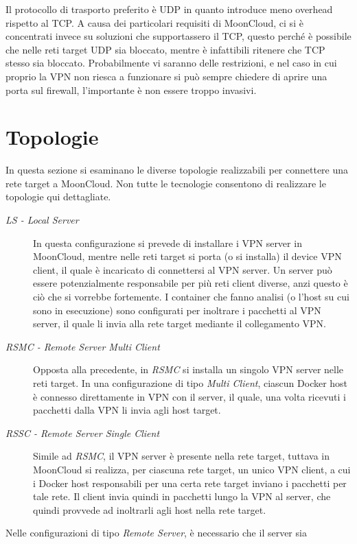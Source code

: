 Il protocollo di trasporto preferito è UDP in quanto introduce meno overhead rispetto al TCP. A causa
dei particolari requisiti di MoonCloud, ci si è concentrati invece su soluzioni che
supportassero il TCP, questo perché è possibile che nelle reti target UDP sia bloccato,
mentre è infattibili ritenere che TCP stesso sia bloccato. Probabilmente vi saranno
delle restrizioni, e nel caso in cui proprio la VPN non riesca a funzionare si può sempre
chiedere di aprire una porta sul firewall, l'importante è non essere troppo invasivi.


\section{Topologie}
In questa sezione si esaminano le diverse topologie realizzabili per connettere una rete
target a MoonCloud. Non tutte le tecnologie consentono di realizzare le topologie qui
dettagliate.
\begin{description}
  \item[\textit{LS - Local Server}]In questa configurazione si prevede di installare i
  VPN server in MoonCloud, mentre nelle reti target si porta (o si installa) il device
  VPN client, il quale è incaricato di connettersi al VPN server. Un server può essere
  potenzialmente responsabile per più reti client diverse, anzi questo
  è ciò che si vorrebbe fortemente. I container che fanno analisi
  (o l'host su cui sono in esecuzione)
  sono configurati per inoltrare i pacchetti al VPN server, il quale li invia alla rete
  target mediante il collegamento VPN.
  \item[\textit{RSMC - Remote Server Multi Client}]Opposta alla precedente, in \textit{RSMC}
  si installa un singolo VPN server nelle reti target. In una configurazione di tipo
  \textit{Multi Client}, ciascun Docker host è connesso direttamente in VPN con il server, il
  quale, una volta ricevuti i pacchetti dalla VPN li invia agli host target.
  \item[\textit{RSSC - Remote Server Single Client}]Simile ad \textit{RSMC}, il VPN
  server è presente nella rete target, tuttava in MoonCloud si realizza, per ciascuna rete
  target, un unico VPN client, a cui i Docker host responsabili per una certa rete target inviano
  i pacchetti per tale rete. Il client invia quindi in pacchetti lungo la VPN al server,
  che quindi provvede ad inoltrarli agli host nella rete target.
\end{description}
Nelle configurazioni di tipo \textit{Remote Server}, è necessario che il server sia
